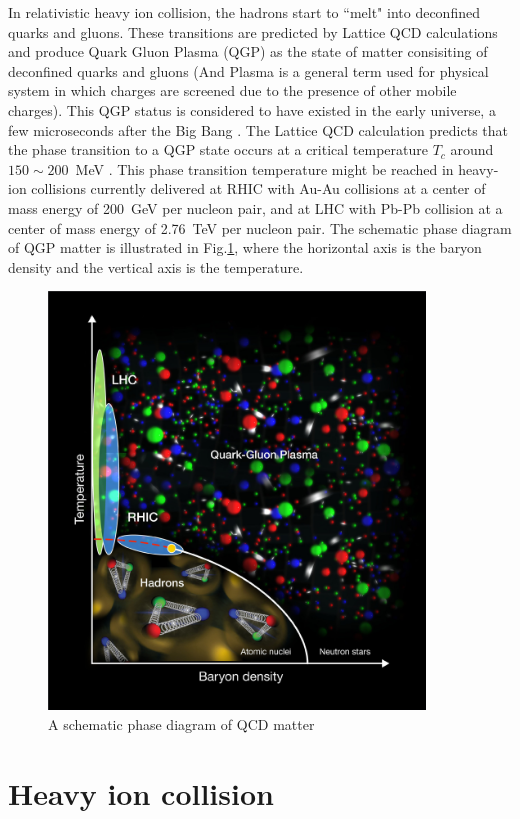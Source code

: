 In relativistic heavy ion collision, the hadrons start to ``melt" into deconfined quarks and gluons. These transitions are predicted by Lattice QCD calculations \cite{Adams:2005dq} and produce Quark Gluon Plasma (QGP) as the state of matter consisiting of deconfined quarks and gluons (And Plasma is a general term used for physical system in which charges are screened due to the presence of other mobile charges). This QGP status is considered to have existed in the early universe, a few microseconds after the Big Bang \cite{PhysRevLett.34.1353, CABIBBO197567}. The Lattice QCD calculation predicts that the phase transition to a QGP state occurs at a critical temperature $T_c$ around $150\sim200$~MeV \cite{karsch}. This phase transition temperature might be reached in heavy-ion collisions currently delivered at RHIC with Au-Au collisions at a center of mass energy of 200~GeV per nucleon pair, and at LHC with Pb-Pb collision at a center of mass energy of 2.76~TeV per nucleon pair. The schematic phase diagram of QGP matter is illustrated in Fig.\ref{fig1}, where the horizontal axis is the baryon density and the vertical axis is the temperature. 
	
	
\begin{figure}[ht]
\centerline{\includegraphics[width=10.0cm]{figures/RHIC_Graphics_Fig1-HR}}
\caption{A schematic phase diagram of QCD matter \cite{fig_phase_dia}}
\label{fig1}
\end{figure}



\section{Heavy ion collision}

